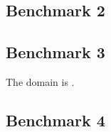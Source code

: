 \subsection*{Benchmark 2}



\subsection*{Benchmark 3}

The domain is . 


\subsection*{Benchmark 4}




